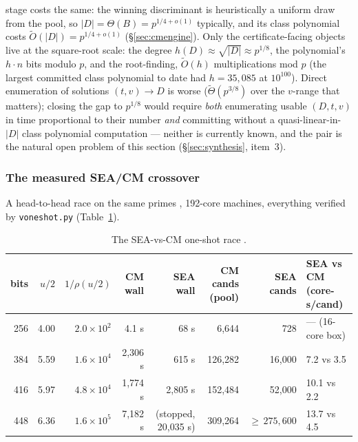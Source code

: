 \documentclass[11pt]{amsart}
\newcommand{\Ot}{\widetilde{O}}
\newcommand{\Tt}{\widetilde{\Theta}}
\newcommand{\osf}{\cite{OSF}}
\theoremstyle{plain}
\theoremstyle{definition}
\theoremstyle{remark}
\begin{document}
stage costs the same: the winning discriminant is heuristically a uniform draw from the pool, so
$|D| = \Theta(B) = p^{1/4+o(1)}$ typically, and its class polynomial costs $\Ot(|D|) = p^{1/4+o(1)}$
(\S\ref{sec:cmengine}).  Only the certificate-facing objects live at the square-root scale: the degree
$h(D) \approx \sqrt{|D|} \approx p^{1/8}$, the polynomial's $h\cdot n$ bits modulo $p$, and the
root-finding, $\Ot(h)$ multiplications mod $p$ (the largest committed class polynomial to
date had $h = 35{,}085$ at $10^{100}$).  Direct enumeration of solutions $(t, v) \to D$ is worse
($\Tt(p^{3/8})$ over the $v$-range that matters); closing the gap to $p^{1/8}$ would require
\emph{both} enumerating usable $(D, t, v)$ in time proportional to their number \emph{and} committing
without a quasi-linear-in-$|D|$ class polynomial computation --- neither is currently known, and the
pair is the natural open problem of this section (\S\ref{sec:synthesis}, item~3).

\subsubsection{The measured SEA/CM crossover}\label{sec:race}
A head-to-head race on the same primes \osf, 192-core machines, everything verified by
\texttt{voneshot.py} (Table~\ref{tab:race}).

\begin{table}[htbp]
\centering\scriptsize
\setlength{\tabcolsep}{4.5pt}
\begin{tabular}{@{}rrrrrrrl@{}}
\toprule
bits & $u/2$ & $1/\rho(u/2)$ & CM wall & SEA wall & CM cands (pool) & SEA cands & SEA vs CM (core-s/cand)\\
\midrule
256 & 4.00 & $2.0\times 10^2$ & 4.1 s & 68 s & 6{,}644 & 728 & --- (16-core box)\\
384 & 5.59 & $1.6\times 10^4$ & 2{,}306 s & 615 s & 126{,}282 & 16{,}000 & 7.2 vs 3.5\\
416 & 5.97 & $4.8\times 10^4$ & 1{,}774 s & 2{,}805 s & 152{,}484 & 52{,}000 & 10.1 vs 2.2\\
448 & 6.36 & $1.6\times 10^5$ & 7{,}182 s & (stopped, 20{,}035 s) & 309{,}264 & ${\ge}\,275{,}600$ & 13.7 vs 4.5\\
\bottomrule
\end{tabular}
\medskip
\caption{The SEA-vs-CM one-shot race \osf.}
\label{tab:race}
\end{table}
\end{document}
